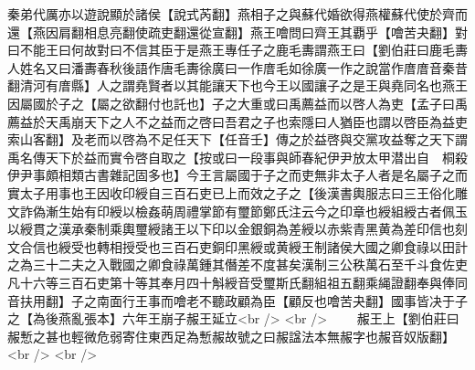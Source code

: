 秦弟代厲亦以遊說顯於諸侯【說式芮翻】燕相子之與蘇代婚欲得燕權蘇代使於齊而還【燕因肩翻相息亮翻使疏吏翻還從宣翻】燕王噲問曰齊王其覇乎【噲苦夬翻】對曰不能王曰何故對曰不信其臣于是燕王專任子之鹿毛夀謂燕王曰【劉伯莊曰鹿毛夀人姓名又曰潘夀春秋後語作唐毛夀徐廣曰一作庴毛如徐廣一作之說當作庴庴音秦昔翻清河有庴縣】人之謂堯賢者以其能讓天下也今王以國讓子之是王與堯同名也燕王因屬國於子之【屬之欲翻付也託也】子之大重或曰禹薦益而以啓人為吏【孟子曰禹薦益於天禹崩天下之人不之益而之啓曰吾君之子也索隱曰人猶臣也謂以啓臣為益吏索山客翻】及老而以啓為不足任天下【任音壬】傳之於益啓與交黨攻益奪之天下謂禹名傳天下於益而實令啓自取之【按或曰一段事與師春紀伊尹放太甲潜出自　桐殺伊尹事頗相類古書雜記固多也】今王言屬國于子之而吏無非太子人者是名屬子之而實太子用事也王因收印綬自三百石吏已上而效之子之【後漢書輿服志曰三王俗化雕文詐偽漸生始有印綬以檢姦萌周禮掌節有璽節鄭氏注云今之印章也綬組綬古者佩玉以綬貫之漢承秦制乘輿璽綬諸王以下印以金銀銅為差綬以赤紫青黑黄為差印信也刻文合信也綬受也轉相授受也三百石吏銅印黑綬或黄綬王制諸侯大國之卿食祿以田計之為三十二夫之入戰國之卿食祿萬鍾其僭差不度甚矣漢制三公秩萬石至千斗食佐吏凡十六等三百石吏第十等其奉月四十斛綬音受璽斯氏翻組祖五翻乘䋲證翻奉與俸同音扶用翻】子之南面行王事而噲老不聽政顧為臣【顧反也噲苦夬翻】國事皆决于子之【為後燕亂張本】六年王崩子赧王延立<br />
<br />
　　赧王上【劉伯莊曰赧慙之甚也輕微危弱寄住東西足為慙赧故號之曰赧諡法本無赧字也赧音奴版翻】<br />
<br />
